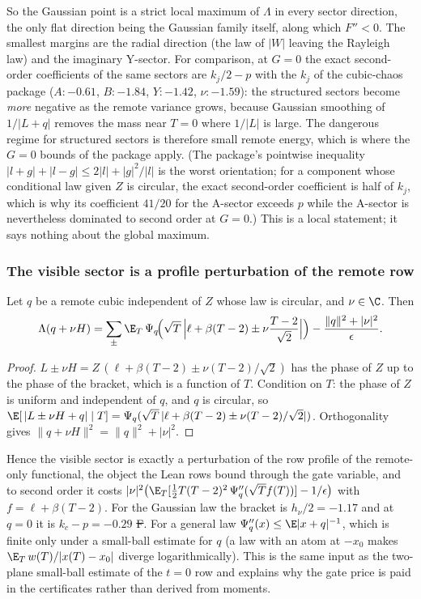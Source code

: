 So the Gaussian point is a strict local maximum of $\Lambda$ in every
sector direction, the only flat direction being the Gaussian family
itself, along which $F''<0$. The smallest margins are the radial
direction (the law of $|W|$ leaving the Rayleigh law) and the imaginary
Y-sector. For comparison, at $G=0$ the exact second-order coefficients
of the same sectors are $k_j/2-p$ with the $k_j$ of the cubic-chaos
package ($A{:}-0.61$, $B{:}-1.84$, $Y{:}-1.42$, $\nu{:}-1.59$): the
structured sectors become \emph{more} negative as the remote variance
grows, because Gaussian smoothing of $1/|L+q|$ removes the mass near
$T=0$ where $1/|L|$ is large. The dangerous regime for structured
sectors is therefore small remote energy, which is where the
$G=0$ bounds of the package apply. (The package's pointwise inequality
$|l+g|+|l-g|\le2|l|+|g|^2/|l|$ is the worst orientation; for a
component whose conditional law given $Z$ is circular, the exact
second-order coefficient is half of $k_j$, which is why its
coefficient $41/20$ for the A-sector exceeds $p$ while the A-sector is
nevertheless dominated to second order at $G=0$.) This is a local
statement; it says nothing about the global maximum.

\subsubsection{The visible sector is a profile perturbation of the remote row}
\begin{lemma}
\label{lem:nu-sector-reduction}
Let $q$ be a remote cubic independent of $Z$ whose law is circular, and
$\nu\in\C$. Then
\[
 \Lambda(q+\nu H)=\sum_{\pm}\E_T\,
 \Psi_q\!\Big(\sqrt T\,\Big|\ell+\beta(T-2)\pm\nu\frac{T-2}{\sqrt2}\Big|\Big)
 -\frac{\|q\|^2+|\nu|^2}{\epsilon}.
\]
\end{lemma}
\begin{proof}
$L\pm\nu H=Z\,(\ell+\beta(T-2)\pm\nu(T-2)/\sqrt2)$ has the phase of $Z$
up to the phase of the bracket, which is a function of $T$. Condition on
$T$: the phase of $Z$ is uniform and independent of $q$, and $q$ is
circular, so $\E[\,|L\pm\nu H+q|\;|\;T]=\Psi_q(\sqrt T\,|\ell+\beta(T-2)\pm\nu(T-2)/\sqrt2|)$.
Orthogonality gives $\|q+\nu H\|^2=\|q\|^2+|\nu|^2$.
\end{proof}
Hence the visible sector is exactly a perturbation of the row profile
of the remote-only functional, the object the Lean rows bound through
the gate variable, and to second order it costs
$|\nu|^2\big(\E_T[\tfrac12T(T-2)^2\,\Psi_q''(\sqrt T f(T))]-1/\epsilon\big)$
with $f=\ell+\beta(T-2)$. For the Gaussian law the bracket is
$h_\nu/2=-1.17$ and at $q=0$ it is $k_c-p=-0.29$ \st{F}. For a general
law $\Psi_q''(x)\le\E|x+q|^{-1}$, which is finite only under a small-ball
estimate for $q$ (a law with an atom at $-x_0$ makes
$\E_T\,w(T)/|x(T)-x_0|$ diverge logarithmically). This is the same input
as the two-plane small-ball estimate of the $t=0$ row and explains why
the gate price is paid in the certificates rather than derived from
moments.

